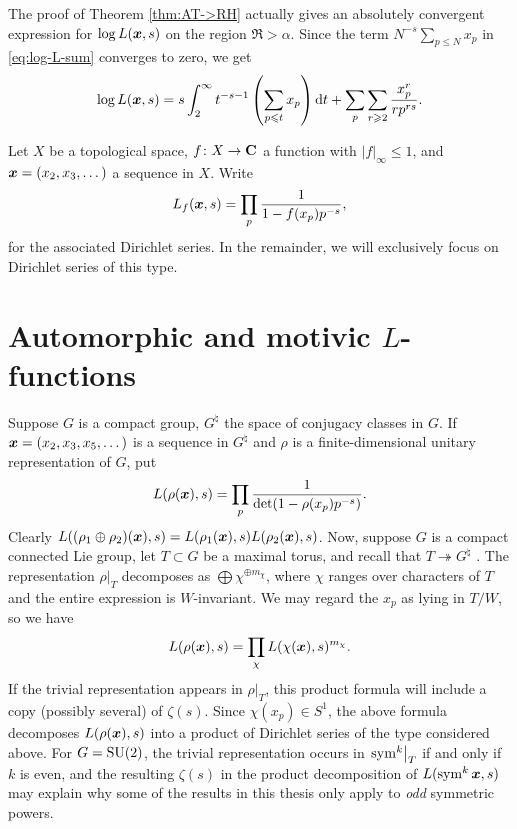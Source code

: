 The proof of Theorem \ref{thm:AT->RH} actually gives an absolutely 
convergent expression for $\log L({\boldsymbol x},s)$ on the region $\Re >\alpha$. Since 
the term $N^{-s} \sum_{p\leqslant N} x_p$ in \eqref{eq:log-L-sum} 
converges to zero, we get 
\[
	\log L({\boldsymbol x},s) = s \int_2^\infty t^{-s-1}\left(\sum_{p\leqslant t} x_p\right) \mathrm{d} t + \sum_p \sum_{r\geqslant 2} \frac{x_p^r}{r p^{r s}} . 
\]

Let $X$ be a topological space, $f\colon X\to \mathbf{C}$ a function with 
$|f|_\infty\leqslant 1$, and ${\boldsymbol x}=(x_2,x_3,\dots)$ a sequence in $X$. Write 
\[
	L_f({\boldsymbol x},s) = \prod_p \frac{1}{1-f(x_p) p^{-s}} ,
\]
for the associated Dirichlet series. In the remainder, we will 
exclusively focus on Dirichlet series of this type. 





\section{Automorphic and motivic \texorpdfstring{$L$}{L}-functions}

Suppose $G$ is a compact group, $G^\natural$ the space of conjugacy classes in 
$G$. If ${\boldsymbol x} = (x_2,x_3,x_5,\dots)$ is a sequence in $G^\natural$ and $\rho$ is 
a finite-dimensional unitary representation of $G$, put 
\[
	L(\rho({\boldsymbol x}),s) = \prod_p \frac{1}{\det(1-\rho(x_p) p^{-s})} .
\]
Clearly $L((\rho_1\oplus \rho_2)({\boldsymbol x}),s) = L(\rho_1({\boldsymbol x}),s) L(\rho_2({\boldsymbol x}),s)$. 
Now, suppose $G$ is a compact connected Lie group, let $T\subset G$ be a 
maximal torus, and recall that 
$T\twoheadrightarrow G^\natural$ \cite[IX.5 Prop.~5]{bourbaki-2005}. 
The representation 
$\left.\rho\right|_T$ decomposes as $\bigoplus \chi^{\oplus m_\chi}$, where 
$\chi$ ranges over characters of $T$ and the entire expression is 
$W$-invariant. We may regard the $x_p$ as lying in $T/W$, so we have 
\[
	L(\rho({\boldsymbol x}),s) = \prod_\chi L(\chi({\boldsymbol x}),s)^{m_\chi} .
\]
If the trivial representation appears in $\left.\rho\right|_T$, this product 
formula will include a copy (possibly several) of $\zeta(s)$. Since 
$\chi(x_p) \in S^1$, the above formula decomposes $L(\rho({\boldsymbol x}),s)$ into a 
product of Dirichlet series of the type considered above. For $G = \operatorname{SU}(2)$, the 
trivial representation occurs in $\left.\operatorname{sym}^k \right|_T$ if and only if $k$ is 
even, and the resulting $\zeta(s)$ in the product decomposition of 
$L(\operatorname{sym}^k {\boldsymbol x},s)$ may explain why some of the results in this thesis only apply 
to \emph{odd} symmetric powers. 

